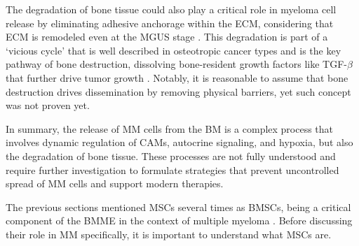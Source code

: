 The degradation of bone tissue could also play a critical role in myeloma cell
release by eliminating adhesive anchorage within the ECM, considering that
\ac{ECM} is remodeled even at the \ac{MGUS} stage
\citet{glaveyProteomicCharacterizationHuman2017}. This degradation is part of a
‘vicious cycle’ that is well described in osteotropic cancer types and is the
key pathway of bone destruction, dissolving bone-resident growth factors like
TGF-$\beta$ that further drive tumor growth
\cite{haradaMyelomaBoneInteraction2021, siclariMolecularInteractionsBreast2007,
wangProstateCancerPromotes2019}. Notably, it is reasonable to assume that bone
destruction drives dissemination by removing physical barriers, yet such concept
was not proven yet.


In summary, the release of \ac{MM} cells from the \ac{BM} is a complex process
that involves dynamic regulation of \acp{CAM}, autocrine signaling, and hypoxia,
but also the degradation of bone tissue. These processes are not fully
understood and require further investigation to formulate strategies that
prevent uncontrolled spread of \ac{MM} cells and support modern therapies.












%
\label{sec:intro_hMSCs}%
The previous sections mentioned \acp{MSC} several times as \acp{BMSC}, being a
critical component of the \ac{BMME} in the context of multiple myeloma
\cite{mangoliniBoneMarrowStromal2020}. Before discussing their role in \ac{MM}
specifically, it is important to understand what \acp{MSC} are.

